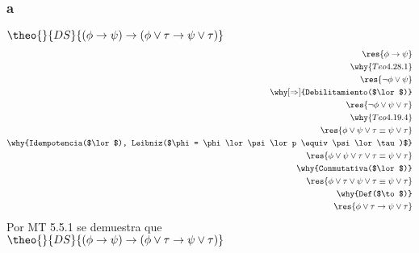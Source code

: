 \documentclass{article}
\begin{document}
\subsubsection{a}
\begin{logicenv}{$\theo{}{DS}{(\phi \to \psi) \to (\phi \lor \tau \to \psi \lor \tau)}$}
    \begin{align*}
            \res{\phi \to \psi}\\
        \why{Teo 4.28.1}\\
            \res{\neg\phi \lor \psi}\\
        \why[\Rightarrow]{Debilitamiento($\lor$)}\\
            \res{\neg\phi \lor \psi \lor \tau}\\
        \why{Teo 4.19.4}\\
            \res{\phi \lor \psi  \lor \tau \equiv \psi \lor \tau}\\
        \why{Idempotencia($\lor$), Leibniz($\phi = \phi \lor \psi \lor p \equiv \psi \lor \tau)$}\\
            \res{\phi \lor \psi \lor \tau \lor \tau \equiv \psi \lor \tau}\\
        \why{Conmutativa($\lor$)}\\
            \res{\phi \lor \tau \lor \psi \lor \tau \equiv \psi \lor \tau}\\
        \why{Def($\to$)}\\
            \res{\phi \lor \tau \to \psi \lor \tau}
    \end{align*}
    Por MT 5.5.1 se demuestra que\\
    $\theo{}{DS}{(\phi \to \psi) \to (\phi \lor \tau \to \psi \lor \tau)}$
\end{logicenv}
\end{document}
